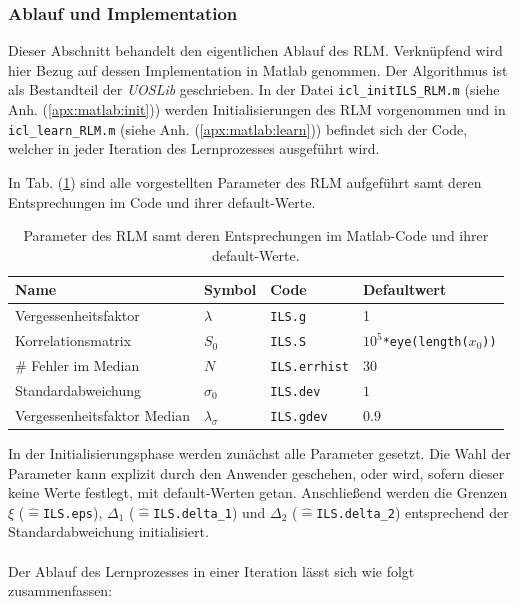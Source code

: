 \documentclass[a4paper, 12pt]{article}
\begin{document}
{\subsubsection{Ablauf und Implementation}
\label{sec:rlm:rlm:implementation}
Dieser Abschnitt behandelt den eigentlichen Ablauf des RLM. Verknüpfend wird hier Bezug auf dessen Implementation in Matlab genommen.
Der Algorithmus ist als Bestandteil der \emph{UOSLib} \cite{UOSLib2013} geschrieben. In der Datei \texttt{icl\_initILS\_RLM.m} (siehe Anh. (\ref{apx:matlab:init})) werden Initialisierungen des RLM vorgenommen und in \texttt{icl\_learn\_RLM.m} (siehe Anh. (\ref{apx:matlab:learn})) befindet sich der Code, welcher in jeder Iteration des Lernprozesses ausgeführt wird.

In Tab. (\ref{tbl:rlm:rlm:impl:params}) sind alle vorgestellten Parameter des RLM aufgeführt samt deren Entsprechungen im Code und ihrer default-Werte. 
\begin{table}[H]
    \center
    \begin{tabular}{ | l | l | l | l |}
    \hline
    \textbf{Name} & \textbf{Symbol} & \textbf{Code} & \textbf{Defaultwert} \\ \hline \hline
    Vergessenheitsfaktor & $\lambda$ & \texttt{ILS.g} & 1\\ \hline
    Korrelationsmatrix & $S_0$ & \texttt{ILS.S} & \texttt{$10^5$*eye(length($x_0$))} \\ \hline
    \# Fehler im Median& $N$ & \texttt{ILS.errhist} & $30$\\ \hline
    Standardabweichung & $\sigma_0$ & \texttt{ILS.dev} & $1$ \\ \hline
    Vergessenheitsfaktor Median & $\lambda_\sigma$ & \texttt{ILS.gdev} & $0.9$ \\ \hline
    \end{tabular}
    \caption{Parameter des RLM samt deren Entsprechungen im Matlab-Code und ihrer default-Werte.}
    \label{tbl:rlm:rlm:impl:params}
\end{table}
In der Initialisierungsphase werden zunächst alle Parameter gesetzt. Die Wahl der Parameter kann explizit durch den Anwender geschehen, oder wird, sofern dieser keine Werte festlegt, mit default-Werten getan. Anschließend werden die Grenzen $\xi$ ($\widehat{=}$\texttt{ILS.eps}), $\Delta_1$ ($\widehat{=}$\texttt{ILS.delta\_1}) und $\Delta_2$ ($\widehat{=}$\texttt{ILS.delta\_2}) entsprechend der Standardabweichung initialisiert.
\\\\
Der Ablauf des Lernprozesses in einer Iteration lässt sich wie folgt zusammenfassen:
}
\end{document}
